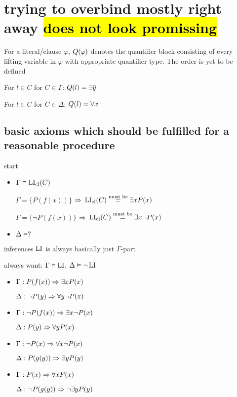 \documentclass[,%
	draft=false,%
	numbers=noendperiod
	11pt,
	a4paper,
	oneside,%
	openany,
]{memoir}
\begin{document}
\chapter{ trying to overbind mostly right away \hl{does not look promissing} }

\begin{defi}[$\Q$]
	For a literal/clause $\varphi$, $Q(\varphi)$ denotes the quantifier block consisting of every lifting variable in $\varphi$ with appropriate quantifier type.
	The order is yet to be defined
\end{defi}

For $l \in C$ for $C \in \Gamma$: $Q(l) = \exists \bar y$

For $l \in C$ for $C \in \Delta$: $Q(l) = \forall \bar x$

\section*{basic axioms which should be fulfilled for a reasonable procedure}

\noindent
start

\begin{itemize}
	\item
		$\Gamma \vDash \operatorname{LI}_{\operatorname{cl}}(C)$

		$\Gamma = \{ P(f(x)) \}$ $\Rightarrow$ $\operatorname{LI}_{\operatorname{cl}}(C) \stackrel{\text{must be}}= \exists x P(x) $

		$\Gamma = \{ \lnot P(f(x)) \}$ $\Rightarrow$ $\operatorname{LI}_{\operatorname{cl}}(C) \stackrel{\text{must be}}= \exists x \lnot P(x) $

	\item
		$\Delta \vDash ?$

\end{itemize}

\noindent
inferences $\operatorname{LI}$ is always basically just $\Gamma$-part

always want: $\Gamma \vDash \operatorname{LI}$, $\Delta \vDash \lnot \operatorname{LI}$

\begin{itemize}
	\item
		$\Gamma: P(f(x)) \Rightarrow \exists x P(x)$

		$\Delta: \lnot P(y) \Rightarrow \forall y \lnot P(x)$

	\item
		$\Gamma: \lnot P(f(x)) \Rightarrow \exists x\lnot  P(x)$

		$\Delta: P(y) \Rightarrow \forall y P(x)$

	\item
		$\Gamma: \lnot P(x) \Rightarrow \forall x \lnot P(x) $

		$\Delta: P(g(y)) \Rightarrow \exists y P(y)$

	\item
		$\Gamma: P(x) \Rightarrow \forall x P(x) $

		$\Delta: \lnot P(g(y)) \Rightarrow \lnot \exists y P(y)$

\end{itemize}
\end{document}
